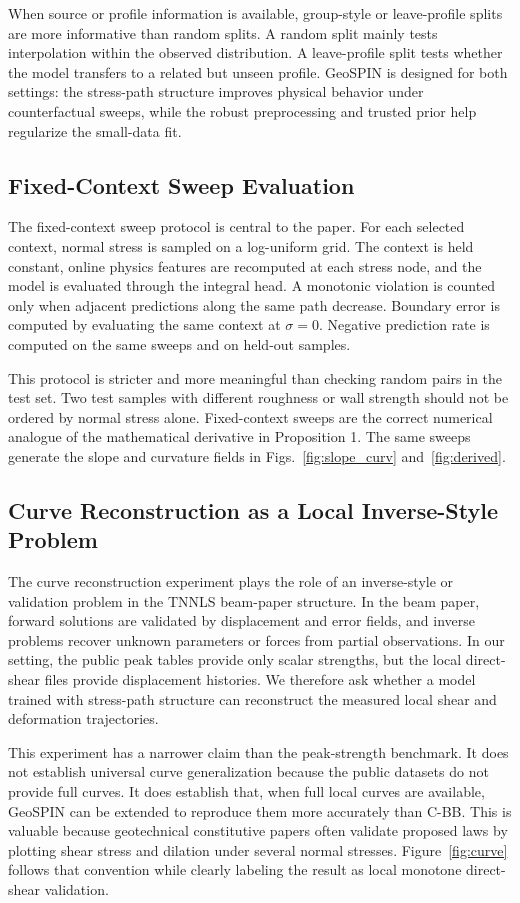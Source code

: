 \documentclass[journal]{IEEEtran}
\begin{document}
When source or profile information is available, group-style or leave-profile splits are more informative than random splits. A random split mainly tests interpolation within the observed distribution. A leave-profile split tests whether the model transfers to a related but unseen profile. GeoSPIN is designed for both settings: the stress-path structure improves physical behavior under counterfactual sweeps, while the robust preprocessing and trusted prior help regularize the small-data fit.

\subsection{Fixed-Context Sweep Evaluation}
The fixed-context sweep protocol is central to the paper. For each selected context, normal stress is sampled on a log-uniform grid. The context is held constant, online physics features are recomputed at each stress node, and the model is evaluated through the integral head. A monotonic violation is counted only when adjacent predictions along the same path decrease. Boundary error is computed by evaluating the same context at $\sigma=0$. Negative prediction rate is computed on the same sweeps and on held-out samples.

This protocol is stricter and more meaningful than checking random pairs in the test set. Two test samples with different roughness or wall strength should not be ordered by normal stress alone. Fixed-context sweeps are the correct numerical analogue of the mathematical derivative in Proposition 1. The same sweeps generate the slope and curvature fields in Figs.~\ref{fig:slope_curv} and~\ref{fig:derived}.

\subsection{Curve Reconstruction as a Local Inverse-Style Problem}
The curve reconstruction experiment plays the role of an inverse-style or validation problem in the TNNLS beam-paper structure. In the beam paper, forward solutions are validated by displacement and error fields, and inverse problems recover unknown parameters or forces from partial observations. In our setting, the public peak tables provide only scalar strengths, but the local direct-shear files provide displacement histories. We therefore ask whether a model trained with stress-path structure can reconstruct the measured local shear and deformation trajectories.

This experiment has a narrower claim than the peak-strength benchmark. It does not establish universal curve generalization because the public datasets do not provide full curves. It does establish that, when full local curves are available, GeoSPIN can be extended to reproduce them more accurately than C-BB. This is valuable because geotechnical constitutive papers often validate proposed laws by plotting shear stress and dilation under several normal stresses. Figure~\ref{fig:curve} follows that convention while clearly labeling the result as local monotone direct-shear validation.
\end{document}

